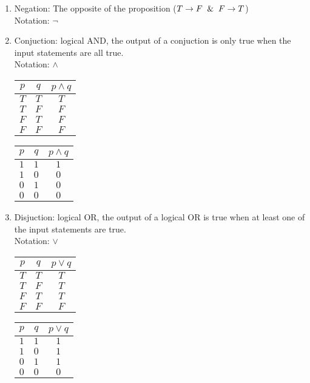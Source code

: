 \documentclass{article}
\begin{document}
\begin{enumerate}[label=Def. \arabic*:, leftmargin=3.5em, align=left]
  \item Negation: The opposite of the proposition ($T \rightarrow F \And F \rightarrow T$)\\
  Notation: $\neg$

  \item Conjuction: logical AND, the output of a conjuction is only true when the input statements are all true.\\
  Notation: $\wedge$
  \begin{center}
    \begin{tabular}{cc|c}
      $p$ & $q$ & $p \wedge q$ \\ \hline 
      $T$ & $T$ & $T$ \\
      $T$ & $F$ & $F$ \\
      $F$ & $T$ & $F$ \\
      $F$ & $F$ & $F$ \\
    \end{tabular} \qquad
    \begin{tabular}{cc|c}
      $p$ & $q$ & $p \wedge q$ \\ \hline 
      $1$ & $1$ & $1$ \\
      $1$ & $0$ & $0$ \\
      $0$ & $1$ & $0$ \\
      $0$ & $0$ & $0$ \\
    \end{tabular}
  \end{center}

  \item Disjuction: logical OR, the output of a logical OR is true when at least one of the input statements are true.\\
  Notation: $\vee$
  \begin{center}
    \begin{tabular}{cc|c}
      $p$ & $q$ & $p \vee q$ \\ \hline 
      $T$ & $T$ & $T$ \\
      $T$ & $F$ & $T$ \\
      $F$ & $T$ & $T$ \\
      $F$ & $F$ & $F$ \\
    \end{tabular} \qquad
    \begin{tabular}{cc|c}
      $p$ & $q$ & $p \vee q$ \\ \hline 
      $1$ & $1$ & $1$ \\
      $1$ & $0$ & $1$ \\
      $0$ & $1$ & $1$ \\
      $0$ & $0$ & $0$ \\
    \end{tabular}
  \end{center}


\end{enumerate}
\end{document}
